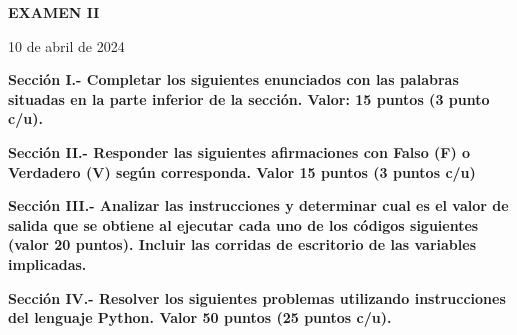\documentclass[10pt,addpoints]{exam}
\begin{document}
\begin{center}
  \sffamily\textbf{EXAMEN II}
\end{center}
\begin{flushright}
10 de abril de 2024
\end{flushright}

\begin{questions}
\begin{EnvFullwidth}
  \sffamily\textbf{Sección I.- Completar los siguientes enunciados con las
  palabras situadas en la parte inferior de la sección. Valor: 15 puntos
  (3 punto c/u).}
\end{EnvFullwidth}








\end{questions}

\begin{questions}
\begin{EnvFullwidth}
  \sffamily\textbf{Sección II.- Responder las siguientes afirmaciones con
  Falso (F) o Verdadero (V) según corres\-ponda. Valor 15 puntos (3 puntos c/u)}
\end{EnvFullwidth}







\end{questions}


\begin{questions}
\begin{EnvFullwidth}
  \sffamily\textbf{Sección III.- Analizar las instrucciones y determinar
  cual es el valor de salida que se obtiene al ejecutar cada uno de los
  códigos siguientes (valor 20 puntos). Incluir las corridas de
  escritorio de las variables implicadas.
  }
\end{EnvFullwidth}



\end{questions}

\begin{questions}
\begin{EnvFullwidth}
  \sffamily\textbf{Sección IV.- Resolver los siguientes problemas utilizando
  instrucciones del lenguaje Python. Valor 50 puntos (25 puntos c/u).}
\end{EnvFullwidth}




\end{questions}
\end{document}
